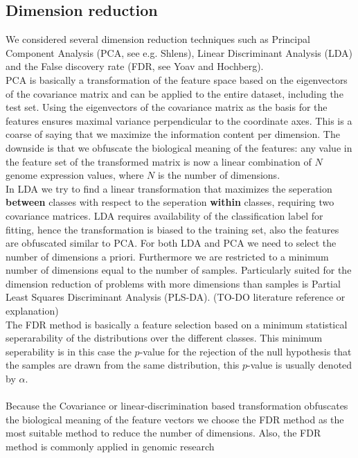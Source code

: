 \documentclass[a4paper,10pt]{article}
\begin{document}
\subsection{Dimension reduction}
%
We considered several dimension reduction techniques such as Principal Component Analysis (PCA, see e.g. Shlens\cite{Shlens2014}), 
Linear Discriminant Analysis (LDA) and the False discovery rate (FDR, see Yoav and Hochberg\cite{Yoav1995}). \\ 
%
PCA is basically a transformation of the feature space based on the eigenvectors 
of the covariance matrix and can be applied to the entire dataset, including the test set.
Using the eigenvectors of the covariance matrix as the basis for the features ensures maximal
variance perpendicular to the coordinate axes. This is a coarse of saying that we maximize the information
content per dimension. The downside is that we obfuscate the biological meaning of the features: any value in the feature set of the transformed matrix is now a linear combination 
of $N$ genome expression values, where $N$ is the number of dimensions. \\
%
In LDA we try to find a linear transformation that maximizes the seperation 
\textbf{between} classes with respect to the seperation \textbf{within} classes, requiring two
covariance matrices. LDA requires availability of the classification label for fitting, hence the transformation is biased to the training set, 
also the features are obfuscated similar to PCA. For both LDA and PCA we need to select the number of dimensions a priori. Furthermore 
we are restricted to a minimum number of dimensions equal to the number of samples. Particularly suited for the dimension reduction
of problems with more dimensions than samples is Partial Least Squares Discriminant Analysis (PLS-DA). (TO-DO literature reference or explanation)  \\ 
%
The FDR method is basically a feature selection based on a minimum statistical seperarability of the distributions over the different classes.
This minimum seperability is in this case the $p$-value for the rejection of the null hypothesis that the samples are drawn from the same distribution, this
$p$-value is usually denoted by $\alpha$.  \\ \\ 
%
Because the Covariance or linear-discrimination based transformation obfuscates the biological meaning of the feature vectors
we choose the FDR method as the most suitable method to reduce the number of dimensions. Also, the FDR method is commonly applied in genomic research
\end{document}

